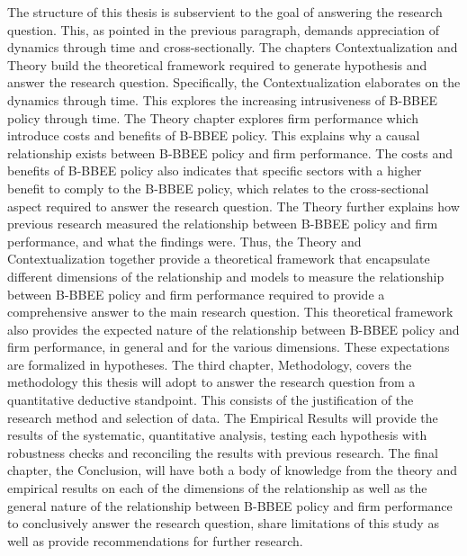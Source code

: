 The structure of this thesis is subservient to the goal of answering the research question. This, as pointed in the previous paragraph, demands appreciation of dynamics through time and cross-sectionally. The chapters Contextualization and Theory build the theoretical framework required to generate hypothesis and answer the research question. Specifically, the Contextualization elaborates on the dynamics through time. This explores the increasing intrusiveness of B-BBEE policy through time. The Theory chapter explores firm performance which introduce costs and benefits of B-BBEE policy. This explains why a causal relationship exists between B-BBEE policy and firm performance. The costs and benefits of B-BBEE policy also indicates that specific sectors with a higher benefit to comply to the B-BBEE policy, which relates to the cross-sectional aspect required to answer the research question. The Theory further explains how previous research measured the relationship between B-BBEE policy and firm performance, and what the findings were. Thus, the Theory and Contextualization together provide a theoretical framework that encapsulate different dimensions of the relationship and models to measure the relationship between B-BBEE policy and firm performance required to provide a comprehensive answer to the main research question. This theoretical framework also provides the expected nature of the relationship between B-BBEE policy and firm performance, in general and for the various dimensions. These expectations are formalized in hypotheses. The third chapter, Methodology, covers the methodology this thesis will adopt to answer the research question from a quantitative deductive standpoint. This consists of the justification of the research method and selection of data. The Empirical Results will provide the results of the systematic, quantitative analysis, testing each hypothesis with robustness checks and reconciling the results with previous research. The final chapter, the Conclusion, will have both a body of knowledge from the theory and empirical results on each of the dimensions of the relationship as well as the general nature of the relationship between B-BBEE policy and firm performance to conclusively answer the research question, share limitations of this study as well as provide recommendations for further research.

